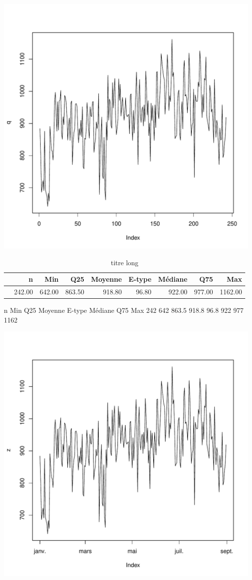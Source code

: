 \documentclass[12pt,english,french,twoside]{report}\usepackage[]{graphicx}\usepackage[]{color}
\makeatletter
\def\maxwidth{ %
  \ifdim\Gin@nat@width>\linewidth
    \linewidth
  \else
    \Gin@nat@width
  \fi
}
\makeatother
\begin{document}
\includegraphics[width=\maxwidth]{figure/passages_totaux1} 
\begin{table}[ht]
\centering
\begin{tabular}{rrrrrrrrr}
  \hline
 & n & Min & Q25 & Moyenne & E-type & Médiane & Q75 & Max \\ 
  \hline
 & 242.00 & 642.00 & 863.50 & 918.80 & 96.80 & 922.00 & 977.00 & 1162.00 \\ 
   \hline
\end{tabular}
\caption[titre court]{titre long} 
\label{label}
\end{table}
   n Min   Q25 Moyenne E-type Médiane Q75  Max
 242 642 863.5   918.8   96.8     922 977 1162

\includegraphics[width=\maxwidth]{figure/passages_totaux2} 
\end{document}
